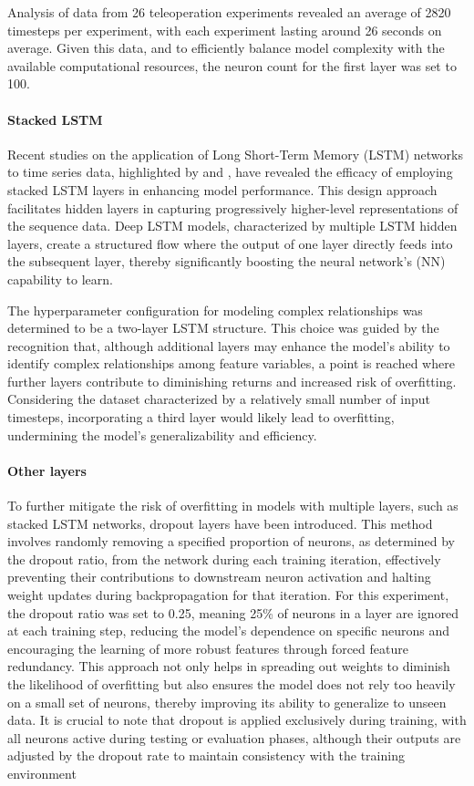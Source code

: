 Analysis of data from 26 teleoperation experiments revealed an average of 2820 timesteps per experiment, with each experiment lasting around 26 seconds on average. 
Given this data, and to efficiently balance model complexity with the available computational resources, the neuron count for the first layer was set to 100. 

\paragraph{Stacked LSTM}

Recent studies on the application of Long Short-Term Memory (LSTM) networks to time series data, highlighted by \cite{cui2019deep} and \cite{9096332}, have revealed the efficacy of employing stacked LSTM layers in enhancing model performance. 
This design approach facilitates hidden layers in capturing progressively higher-level representations of the sequence data. 
Deep LSTM models, characterized by multiple LSTM hidden layers, create a structured flow where the output of one layer directly feeds into the subsequent layer, thereby significantly boosting the neural network's (NN) capability to learn. 

The hyperparameter configuration for modeling complex relationships was determined to be a two-layer LSTM structure. 
This choice was guided by the recognition that, although additional layers may enhance the model's ability to identify complex relationships among feature variables, a point is reached where further layers contribute to diminishing returns and increased risk of overfitting. Considering the dataset characterized by a relatively small number of input timesteps, incorporating a third layer would likely lead to overfitting, undermining the model's generalizability and efficiency.

\paragraph{Other layers}

To further mitigate the risk of overfitting in models with multiple layers, such as stacked LSTM networks, dropout layers have been introduced. 
This method involves randomly removing a specified proportion of neurons, as determined by the dropout ratio, from the network during each training iteration, effectively preventing their contributions to downstream neuron activation and halting weight updates during backpropagation for that iteration. For this experiment, the dropout ratio was set to 0.25, meaning 25\% of neurons in a layer are ignored at each training step, reducing the model's dependence on specific neurons and encouraging the learning of more robust features through forced feature redundancy. 
This approach not only helps in spreading out weights to diminish the likelihood of overfitting but also ensures the model does not rely too heavily on a small set of neurons, thereby improving its ability to generalize to unseen data. 
It is crucial to note that dropout is applied exclusively during training, with all neurons active during testing or evaluation phases, although their outputs are adjusted by the dropout rate to maintain consistency with the training environment

